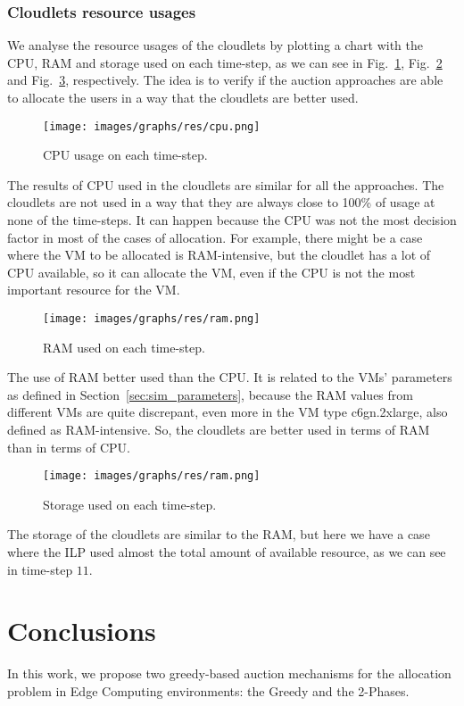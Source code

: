 \documentclass[English]{ic-tese-v3}
\begin{document}
\subsection{Cloudlets resource usages}
We analyse the resource usages of the cloudlets by plotting a chart with the CPU, RAM and storage used on each time-step, as we can see in Fig.~\ref{fig:cpu}, Fig.~\ref{fig:ram} and Fig.~\ref{fig:storage}, respectively. The idea is to verify if the auction approaches are able to allocate the users in a way that the cloudlets are better used.
\begin{figure}
    \centering
    \texttt{[image: images/graphs/res/cpu.png]}
    \caption{CPU usage on each time-step.}
    \label{fig:cpu}
\end{figure}
The results of CPU used in the cloudlets are similar for all the approaches. The cloudlets are not used in a way that they are always close to 100\% of usage at none of the time-steps. It can happen because the CPU was not the most decision factor in most of the cases of allocation. For example, there might be a case where the VM to be allocated is RAM-intensive, but the cloudlet has a lot of CPU available, so it can allocate the VM, even if the CPU is not the most important resource for the VM.
\begin{figure}
    \centering
    \texttt{[image: images/graphs/res/ram.png]}
    \caption{RAM used on each time-step.}
    \label{fig:ram}
\end{figure}
The use of RAM better used than the CPU. It is related to the VMs' parameters as defined in Section~\ref{sec:sim_parameters}, because the RAM values from different VMs are quite discrepant, even more in the VM type c6gn.2xlarge, also defined as RAM-intensive. So, the cloudlets are better used in terms of RAM than in terms of CPU.

\begin{figure}
    \centering
    \texttt{[image: images/graphs/res/ram.png]}
    \caption{Storage used on each time-step.}
    \label{fig:storage}
\end{figure}
The storage of the cloudlets are similar to the RAM, but here we have a case where the ILP used almost the total amount of available resource, as we can see in time-step $11$.

\chapter{Conclusions}
\label{ch:conc}
In this work, we propose two greedy-based auction mechanisms for the allocation problem in Edge Computing environments: the Greedy and the 2-Phases.
\end{document}
